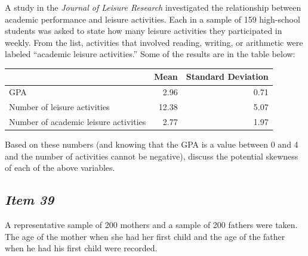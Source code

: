 A study in the \textit{Journal of Leisure Research} investigated the relationship between academic performance and leisure activities. Each in a sample of 159 high-school students was asked to state how many leisure activities they participated in weekly. From the list, activities that involved reading, writing, or arithmetic were labeled ``academic leisure activities.'' Some of the results are in the table below:





\begin{table}[!ht]


\begin{center}


\begin{tabular}{lrr}


\hline


& Mean & Standard Deviation\\


\hline


GPA & 2.96 & 0.71\\


Number of leisure activities & 12.38 & 5.07\\


Number of academic leisure activities & 2.77 & 1.97\\


\hline


\end{tabular}


\end{center}


\end{table}





Based on these numbers (and knowing that the GPA is a value between 0 and 4 and the number of activities cannot be negative), discuss the potential skewness of each of the above variables.


\subsection{\textbf{\textit{Item 39}}}


A representative sample of 200 mothers and a sample of 200 fathers were taken. The age of the mother when she had her first child and the age of the father when he had his first child were recorded.





